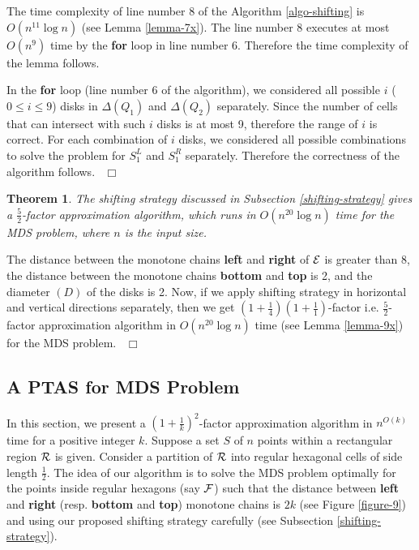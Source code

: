 \documentclass[a4paper,11pt]{article}
\newtheorem{theorem}{Theorem}
\newenvironment{proof}{\noindent {\bf Proof:\,\ }}{\hfill\mbox{\
$\Box$}\smallskip}
\begin{document}
\begin{proof}
 The time complexity of line number 8 of the Algorithm \ref{algo-shifting} is $O(n^{11} \log n)$ 
 (see Lemma \ref{lemma-7x}). The line number 8 executes at most $O(n^9)$ time by the {\bf for} loop 
 in line number 6. Therefore the time complexity of the lemma follows.
 
 In the {\bf for} loop (line number 6 of the algorithm), we considered 
 all possible $i$ ($0 \leq i \leq 9$) disks in $\Delta(Q_1)$ and $\Delta(Q_2)$ separately. Since 
 the number of cells that can intersect with such $i$ disks is at most 9, therefore the range of $i$ is correct. 
 For each combination of $i$ disks, we considered all possible combinations to solve the problem 
 for $S_1^L$ and $S_1^R$ separately. Therefore the correctness of the algorithm follows. 
\end{proof}


\begin{theorem} \label{theorem-3y}
The shifting strategy discussed in Subsection \ref{shifting-strategy} gives a $\frac{5}{2}$-factor 
approximation algorithm, which runs in $O(n^{20} \log n)$ time for the MDS problem, where $n$ is the 
input size.
\end{theorem}

\begin{proof}
The distance between the monotone chains {\bf left} and {\bf right} of ${\cal E}$ is greater than 8,  
the distance between the monotone chains {\bf bottom} and {\bf top} is 2, and the diameter $(D)$ of the 
disks is 2. Now, if we apply shifting 
strategy in horizontal and vertical directions separately, then we get $(1+\frac{1}{4})(1+\frac{1}{1})$-factor 
i.e. $\frac{5}{2}$-factor approximation algorithm in $O(n^{20} \log n)$ time (see Lemma \ref{lemma-9x}) 
for the MDS problem. 
\end{proof}

\subsection{A PTAS for MDS Problem}
In this section, we present a $(1+\frac{1}{k})^2$-factor approximation algorithm in $n^{O(k)}$ time for 
a positive integer $k$. Suppose a set $S$ of $n$ points within a rectangular region ${\cal R}$ is given. 
Consider a partition of ${\cal R}$ into regular hexagonal cells of side length $\frac{1}{2}$. The idea 
of our algorithm is to solve the MDS problem optimally for the points inside regular hexagons (say ${\cal F}$) 
such that the distance between {\bf left} and {\bf right} (resp. {\bf bottom} and {\bf top}) monotone chains 
is $2k$ (see Figure \ref{figure-9}) and using our proposed shifting strategy carefully 
(see Subsection \ref{shifting-strategy}). 
\end{document}
